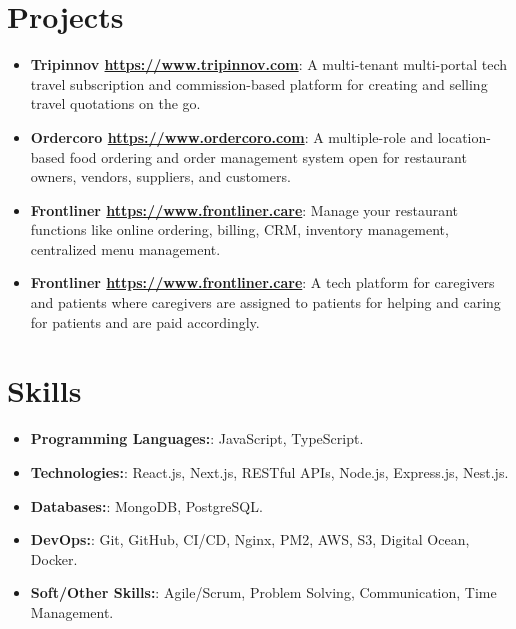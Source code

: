 \documentclass[letterpaper,11pt]{article}
\newcommand{\resumeItem}[2]{
  \item\small{
    \textbf{#1}{: #2 \vspace{-2pt}}
  }
}
\newcommand{\resumeSubItem}[2]{\resumeItem{#1}{#2}\vspace{-4pt}}
\newcommand{\resumeSubHeadingListStart}{\begin{itemize}[leftmargin=*]}
\newcommand{\resumeSubHeadingListEnd}{\end{itemize}}
\begin{document}
\section{Projects}
  \resumeSubHeadingListStart
    \resumeSubItem{Tripinnov \href{https://tripinnov.com/}{https://www.tripinnov.com}}
      {A multi-tenant multi-portal tech travel subscription and commission-based platform for creating and selling travel quotations on the go.}
    \resumeSubItem{Ordercoro \href{https://ordercoro.com/}{https://www.ordercoro.com}}
      {A multiple-role and location-based food ordering and order management system open for restaurant owners, vendors, suppliers, and customers.}
    \resumeSubItem{Frontliner \href{https://frontliner.care/}{https://www.frontliner.care}}
      {Manage your restaurant functions like online ordering, billing, CRM, inventory management, centralized menu management.}
    \resumeSubItem{Frontliner \href{https://frontliner.care/}{https://www.frontliner.care}}
      {A tech platform for caregivers and patients where caregivers are assigned to patients for helping and caring for patients and are paid accordingly.}
  \resumeSubHeadingListEnd

%
\section{Skills}
 \resumeSubHeadingListStart
    \resumeSubItem{Programming Languages:} {JavaScript, TypeScript.}
    \resumeSubItem{Technologies:} {React.js, Next.js, RESTful APIs, Node.js, Express.js, Nest.js.}
    \resumeSubItem{Databases:} {MongoDB, PostgreSQL.}
    \resumeSubItem{DevOps:} {Git, GitHub, CI/CD, Nginx, PM2, AWS, S3, Digital Ocean, Docker.}
    \resumeSubItem{Soft/Other Skills:} {Agile/Scrum, Problem Solving, Communication, Time Management.}
 \resumeSubHeadingListEnd

\end{document}
